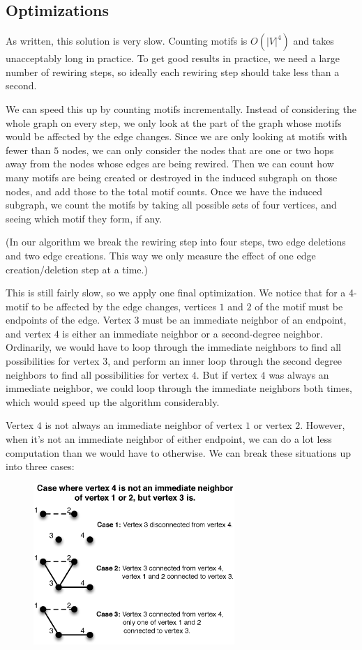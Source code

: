 \subsection{Optimizations}
As written, this solution is very slow.  Counting motifs is $O(|V|^4)$ and takes unacceptably long in practice.  To get good results in practice, we need a large number of rewiring steps, so ideally each rewiring step should take less than a second.

We can speed this up by counting motifs incrementally.  Instead of considering the whole graph on every step, we only look at the part of the graph whose motifs would be affected by the edge changes.  Since we are only looking at motifs with fewer than $5$ nodes, we can only consider the nodes that are one or two hops away from the nodes whose edges are being rewired.  Then we can count how many motifs are being created or destroyed in the induced subgraph on those nodes, and add those to the total motif counts.  Once we have the induced subgraph, we count the motifs by taking all possible sets of four vertices, and seeing which motif they form, if any.

(In our algorithm we break the rewiring step into four steps, two edge deletions and two edge creations.  This way we only measure the effect of one edge creation/deletion step at a time.)

This is still fairly slow, so we apply one final optimization.  We notice that for a 4-motif to be affected by the edge changes, vertices $1$ and $2$ of the motif must be endpoints of the edge.  Vertex $3$ must be an immediate neighbor of an endpoint, and vertex $4$ is either an immediate neighbor or a second-degree neighbor.  Ordinarily, we would have to loop through the immediate neighbors to find all possibilities for vertex $3$, and perform an inner loop through the second degree neighbors to find all possibilities for vertex $4$.  But if vertex $4$ was always an immediate neighbor, we could loop through the immediate neighbors both times, which would speed up the algorithm considerably.

Vertex $4$ is not always an immediate neighbor of vertex $1$ or vertex $2$.  However, when it's not an immediate neighbor of either endpoint, we can do a lot less computation than we would have to otherwise.  We can break these situations up into three cases:

\begin{figure}[t]
\centering
\includegraphics[width=3in]{Figures/case1.eps}
\label{fig:case}
\end{figure}


